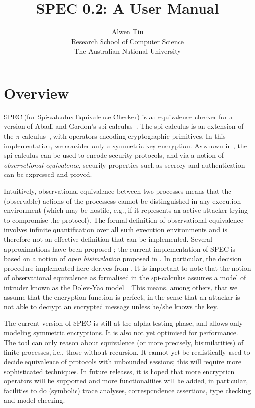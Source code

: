 \documentclass{article}
\title{SPEC 0.2: A User Manual}
\author{Alwen Tiu \\ 
Research School of Computer Science\\
The Australian National University
}
\date{}
\begin{document}
\maketitle

\section{Overview}
\label{sec:overview}

SPEC (for Spi-calculus Equivalence Checker) is an equivalence checker for 
a version of Abadi and Gordon's spi-calculus~\cite{abadi99ic}. 
The spi-calculus is an extension of the $\pi$-calculus~\cite{milner92icII}, with
operators encoding cryptographic primitives. In this implementation, we consider
only a symmetric key encryption. As shown in \cite{abadi99ic}, the spi-calculus can be
used to encode security protocols, and via a notion of {\em observational equivalence},
security properties such as secrecy and authentication can be expressed and proved. 

Intuitively, observational equivalence between two processes means that the (observable)
actions of the processess cannot be distinguished in any execution environment (which 
may be hostile, e.g., if it represents an active attacker trying to compromise the
protocol). The formal definition of observational equivalence ~\cite{abadi99ic} involves
infinite quantification over all such execution environments and is therefore 
not an effective definition that can be implemented. Several approximations have been
proposed \cite{abadi98njc,boreale02sjc,borgstrom04concur,borgstrom05mscs,tiu07aplas,tiu09corr};
the current implementation of SPEC is based on a notion of {\em open bisimulation}
proposed in \cite{tiu07aplas,tiu09corr}. In particular, the decision procedure implemented here derives from
\cite{tiu10csf}. It is important to note that the notion of observational equivalence as
formalised in the spi-calculus assumes a model of intruder known as the Dolev-Yao model~\cite{dolev83tit}.
This means, among others, that we assume that the encryption function is perfect, in the sense that
an attacker is not able to decrypt an encrypted message unless he/she knows the key. 

The current version of SPEC is still at the alpha testing phase, and allows only 
modeling symmetric encryptions. It is also not yet optimised for 
performance. The tool can only reason about equivalence (or more precisely,
bisimilarities) of finite processes, i.e., those without recursion. It cannot yet be realistically
used to decide equivalence of protocols with unbounded sessions; this will require
more sophisticated techniques.  
In future releases, it is hoped that more encryption operators will be supported
and more functionalities will be
added, in particular, facilities to do (symbolic) trace analyses, correspondence assertions,
type checking and model checking. 
\end{document}
